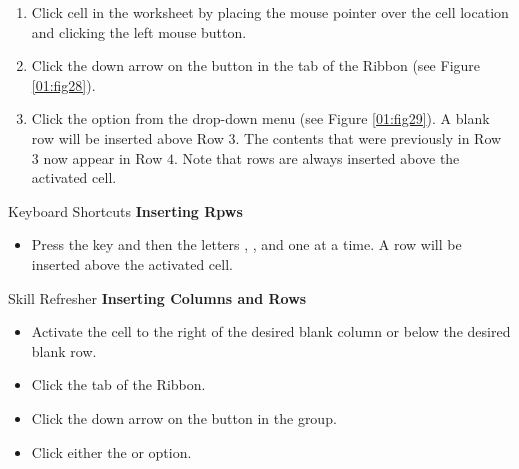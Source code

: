 \begin{enumerate}[resume]
	\item Click cell  in the  worksheet by placing the mouse pointer over the cell location and clicking the left mouse button.
	\item Click the down arrow on the  button in the  tab of the Ribbon (see Figure \ref{01:fig28}).
	\item Click the  option from the drop-down menu (see Figure \ref{01:fig29}). A blank row will be inserted above Row $ 3 $. The contents that were previously in Row $ 3 $ now appear in Row $ 4 $. Note that rows are always inserted above the activated cell.
\end{enumerate}

\begin{center}
	\begin{shtcutbox}{Keyboard Shortcuts}
		\textbf{Inserting Rpws}
		\\
		\begin{itemize}
			\setlength{\itemsep}{0pt}
			\setlength{\parskip}{0pt}
			\setlength{\parsep}{0pt}
			
			\item Press the  key and then the letters , , and  one at a time. A row will be inserted above the activated cell.
			
		\end{itemize}
	\end{shtcutbox}
\end{center}

\begin{center}
	\begin{sklbox}{Skill Refresher}
		\textbf{Inserting Columns and Rows}
		\\
		\begin{itemize}
			\setlength{\itemsep}{0pt}
			\setlength{\parskip}{0pt}
			\setlength{\parsep}{0pt}
			
			\item Activate the cell to the right of the desired blank column or below the desired blank row.
			\item Click the  tab of the Ribbon.
			\item Click the down arrow on the  button in the  group.
			\item Click either the  or  option.
			
		\end{itemize}
	\end{sklbox}
\end{center}


